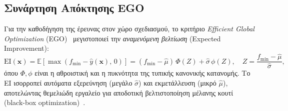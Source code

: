 \subsection*{Συνάρτηση Απόκτησης EGO}

Για την καθοδήγηση της έρευνας στον χώρο σχεδιασμού, το κριτήριο \textit{Efficient Global Optimization} (EGO)~\cite{jones1998ego} μεγιστοποιεί την \textit{αναμενόμενη βελτίωση} (Expected Improvement):
\begin{equation}
    \text{EI}(\bm{x}) = \mathbb{E}\!\left[\max(f_{\min} - \hat{y}(\bm{x}),\, 0)\right]
    = (f_{\min} - \hat{\mu})\,\Phi(Z) + \hat{\sigma}\,\phi(Z),
    \quad Z = \frac{f_{\min} - \hat{\mu}}{\hat{\sigma}},
\end{equation}
όπου $\Phi, \phi$ είναι η αθροιστική και η πυκνότητα της τυπικής κανονικής κατανομής. Το EI ισορροπεί αυτόματα εξερεύνηση (μεγάλο $\hat{\sigma}$) και εκμετάλλευση (μικρό $\hat{\mu}$), αποτελώντας θεμελιώδη εργαλείο για αποδοτική βελτιστοποίηση μέλανης κουτί (black-box optimization)~\cite{forrester2008engineering}.
